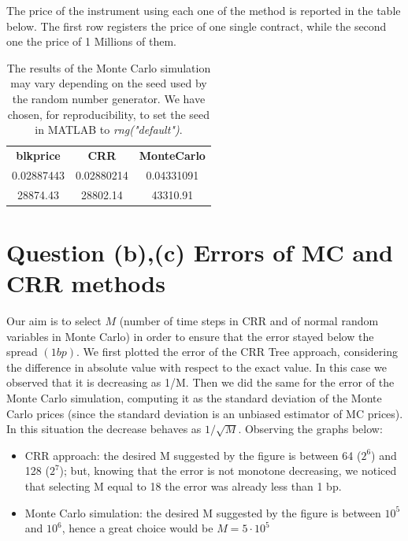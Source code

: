 The price of the instrument using each one of the method is reported in the table below. The first row registers the price of one single contract, while the second one the price of 1 Millions of them.

\begin{table}[htpb]
    \centering
    \begin{tabular}{|| c | c | c ||}
    \hline
        \textbf{blkprice} & \textbf{CRR} & \textbf{MonteCarlo} \\
        0.02887443 & 0.02880214 & 0.04331091 \\
        28874.43 & 28802.14 & 43310.91 \\
    \hline
    \end{tabular}
    \caption{The results of the Monte Carlo simulation may vary depending on the seed used by the random number generator. We have chosen, for reproducibility, to set the seed in \textsc{MATLAB} to \textit{rng("default")}.}
    \label{tab:price_a}
\end{table}

\section{Question (b),(c) Errors of MC and CRR methods}
Our aim is to select $M$ (number of time steps in CRR and of normal random variables in Monte Carlo) in order to ensure that the error stayed below the spread $(1bp)$. We first plotted the error of the CRR Tree approach, considering the difference in absolute value with respect to the exact value. In this case we observed that it is decreasing as 1/M. Then we did the same for the error of the Monte Carlo simulation, computing it as the standard deviation of the Monte Carlo prices (since the standard deviation is an unbiased estimator of MC prices). In this situation the decrease behaves as $1/\sqrt{M}$.
Observing the graphs below:
\begin{itemize}
\item CRR approach: the desired M suggested by the figure is between 64 (\( 2^6 \)) and 128 (\( 2^7 \)); but, knowing that the error is not monotone decreasing, we noticed that selecting M equal to 18 the error was already less than 1 bp.

\item Monte Carlo simulation: the desired M suggested by the figure is between \( 10^5 \) and \( 10^6 \), hence a great choice would be $M=5\cdot  10^5$

\end{itemize}

